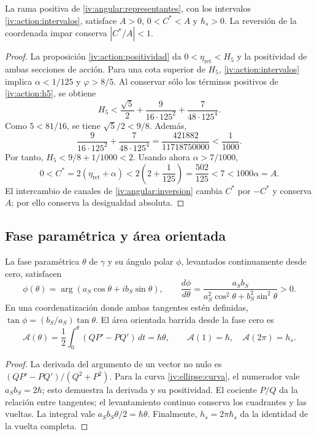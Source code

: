 \begin{proposition}
\label{iv:ellipse:pertenencia}
La rama positiva de \eqref{iv:angular:representantes}, con los
intervalos \eqref{iv:action:intervalos}, satisface
\(A>0\), \(0<C^*<A\) y \(\hbar_s>0\).
La reversión de la coordenada impar conserva \(|C^*/A|<1\).
\end{proposition}
\begin{proof}
La proposición \ref{iv:action:positividad} da
\(0<\eta_{\mathrm{ret}}<H_5\) y la positividad de ambas
secciones de acción. Para una cota superior de \(H_5\),
\eqref{iv:action:intervalos} implica
\(\alpha<1/125\) y \(\varphi>8/5\). Al conservar sólo
los términos positivos de \eqref{iv:action:h5}, se obtiene
\[
 H_5<
 \frac{\sqrt5}{2}+
 \frac{9}{16\cdot125^2}+
 \frac{7}{48\cdot125^4}.
\]
Como \(5<81/16\), se tiene \(\sqrt5/2<9/8\). Además,
\[
 \frac{9}{16\cdot125^2}+
 \frac{7}{48\cdot125^4}
 =\frac{421882}{11718750000}<\frac1{1000}.
\]
Por tanto, \(H_5<9/8+1/1000<2\). Usando ahora
\(\alpha>7/1000\),
\[
 0<C^*=2(\eta_{\mathrm{ret}}+\alpha)
 <2\left(2+\frac1{125}\right)=\frac{502}{125}
 <7<1000\alpha=A.
\]
El intercambio de canales de
\ref{iv:angular:inversion} cambia \(C^*\) por \(-C^*\)
y conserva \(A\); por ello conserva la desigualdad absoluta.
\end{proof}

\subsection{Fase paramétrica y área orientada}
\label{iv:ellipse:area}

\begin{proposition}
\label{iv:ellipse:ley-areal}
La fase paramétrica \(\theta\) de \(\gamma\) y su ángulo
polar \(\phi\), levantados continuamente desde cero, satisfacen
\begin{equation}
 \phi(\theta)=\arg(a_S\cos\theta+i b_S\sin\theta),\qquad
 \frac{d\phi}{d\theta}
 =\frac{a_Sb_S}{a_S^2\cos^2\theta+b_S^2\sin^2\theta}>0.
 \label{iv:ellipse:fases}
\end{equation}
En una coordenatización donde ambas tangentes estén definidas,
\(\tan\phi=(b_S/a_S)\tan\theta\). El área orientada barrida
desde la fase cero es
\begin{equation}
 \mathcal A(\theta)=
 \frac12\int_0^\theta(QP'-PQ')\,dt=\hbar\theta,
 \qquad
 \mathcal A(1)=\hbar,\quad\mathcal A(2\pi)=h_s.
 \label{iv:ellipse:area-fase}
\end{equation}
\end{proposition}
\begin{proof}
La derivada del argumento de un vector no nulo es
\((QP'-PQ')/(Q^2+P^2)\). Para la curva
\eqref{iv:ellipse:curva}, el numerador vale
\(a_Sb_S=2\hbar\); esto demuestra la derivada y su
positividad. El cociente \(P/Q\) da la relación entre tangentes;
el levantamiento continuo conserva los cuadrantes y las vueltas.
La integral vale \(a_Sb_S\theta/2=\hbar\theta\).
Finalmente, \(h_s=2\pi\hbar_s\) da la identidad de la
vuelta completa.
\end{proof}

